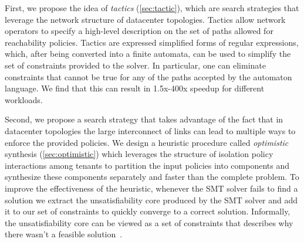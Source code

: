 First, we
propose the idea of \emph{tactics} (\cref{sec:tactic}), which are
search strategies that leverage the network structure of datacenter
topologies.
Tactics allow network operators to specify a
high-level description on the set of paths allowed for reachability
policies.  Tactics are expressed simplified forms of
regular expressions, which, after being converted into a finite
automata, can be used to simplify the set of constraints provided to
the solver.  In particular, one can eliminate constraints that cannot
be true for any of the paths accepted by the automaton language. We
find that this can result in 1.5x-400x speedup for different workloads.

Second, we propose a search strategy that takes advantage of the fact that in 
datacenter topologies the large
interconnect of links can lead to multiple ways 
to enforce the provided policies.  
We design a heuristic procedure called \emph{optimistic}
synthesis (\cref{sec:optimistic}) which leverages the structure of
isolation policy interactions among tenants to partition the input
policies into components and synthesize these components separately and
faster than the complete problem. To improve the effectiveness of the
heuristic, whenever the SMT solver fails to find a solution we extract
the unsatisfiability core produced by the SMT solver and 
add it to our set of constraints to quickly converge to a correct solution.
Informally, the unsatisfiability core can be viewed
as a set of constraints that describes why there wasn't a feasible solution~\cite{}.

